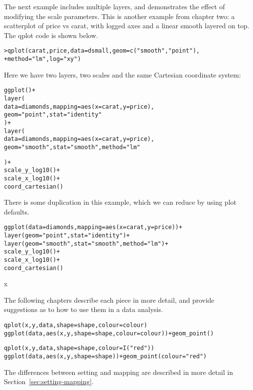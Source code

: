 The next example includes multiple layers, and demonstrates the effect of modifying the scale parameters.  This is another example from chapter two: a scatterplot of price vs carat, with logged axes and a linear smooth layered on top.  The qplot code is shown below.

\begin{alltt}
> qplot(carat, price, data = dsmall, geom = c("smooth", "point"), 
+     method = "lm", log = "xy")

\end{alltt}

Here we have two layers, two scales and the same Cartesian coordinate system:

\begin{alltt}
ggplot() + 
layer(
  data = diamonds, mapping = aes(x = carat, y = price),
  geom = "point", stat = "identity"
) + 
layer(
  data = diamonds, mapping = aes(x = carat, y = price),
  geom = "smooth", stat = "smooth", method = "lm"
  
) + 
scale_y_log10() + 
scale_x_log10() + 
coord_cartesian()
\end{alltt}

There is some duplication in this example, which we can reduce by using plot defaults.

\begin{alltt}
ggplot(data = diamonds, mapping = aes(x = carat, y = price)) + 
layer(geom = "point", stat = "identity") + 
layer(geom = "smooth", stat = "smooth", method = "lm") + 
scale_y_log10() + 
scale_x_log10() + 
coord_cartesian()
\end{alltt}x

The following chapters describe each piece in more detail, and provide suggestions as to how to use them in a data analysis.


\begin{alltt}
qplot(x, y, data, shape=shape, colour = colour)
ggplot(data, aes(x, y, shape=shape, colour = colour)) + geom_point()
\end{alltt}

\begin{alltt}
qplot(x, y, data, shape=shape, colour = I("red"))
ggplot(data, aes(x, y, shape=shape)) + geom_point(colour="red")
\end{alltt}

The differences between setting and mapping are described in more detail in Section~\ref{sec:setting-mapping}.

